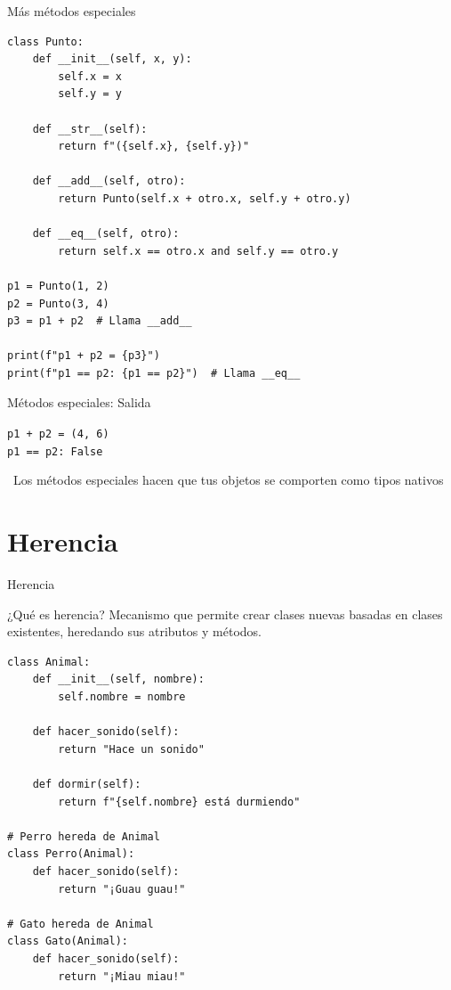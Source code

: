 \documentclass{beamer}
\begin{document}
\begin{frame}[fragile]{Más métodos especiales \faCalculator}
\begin{lstlisting}
class Punto:
    def __init__(self, x, y):
        self.x = x
        self.y = y
    
    def __str__(self):
        return f"({self.x}, {self.y})"
    
    def __add__(self, otro):
        return Punto(self.x + otro.x, self.y + otro.y)
    
    def __eq__(self, otro):
        return self.x == otro.x and self.y == otro.y

p1 = Punto(1, 2)
p2 = Punto(3, 4)
p3 = p1 + p2  # Llama __add__

print(f"p1 + p2 = {p3}")
print(f"p1 == p2: {p1 == p2}")  # Llama __eq__
\end{lstlisting}
\end{frame}

\begin{frame}[fragile]{Métodos especiales: Salida \faArrowCircleRight}
\begin{tcolorbox}[colback=green!10,colframe=green,title={\small\faArrowCircleRight \ Salida},coltitle=fg0,left=3pt,right=3pt,top=3pt,bottom=3pt,boxsep=2pt]
\small\texttt{p1 + p2 = (4, 6)\\
p1 == p2: False}
\end{tcolorbox}

\vspace{0.3cm}
\begin{notebox}
\small\faInfoCircle\ Los métodos especiales hacen que tus objetos se comporten como tipos nativos
\end{notebox}
\end{frame}

\section{Herencia}

\begin{frame}[fragile]{Herencia \faProjectDiagram}
\begin{conceptbox}{¿Qué es herencia?}
Mecanismo que permite crear clases nuevas basadas en clases existentes, heredando sus atributos y métodos.
\end{conceptbox}

\begin{lstlisting}
class Animal:
    def __init__(self, nombre):
        self.nombre = nombre
    
    def hacer_sonido(self):
        return "Hace un sonido"
    
    def dormir(self):
        return f"{self.nombre} está durmiendo"

# Perro hereda de Animal
class Perro(Animal):
    def hacer_sonido(self):
        return "¡Guau guau!"

# Gato hereda de Animal
class Gato(Animal):
    def hacer_sonido(self):
        return "¡Miau miau!"
\end{lstlisting}
\end{frame}
\end{document}
